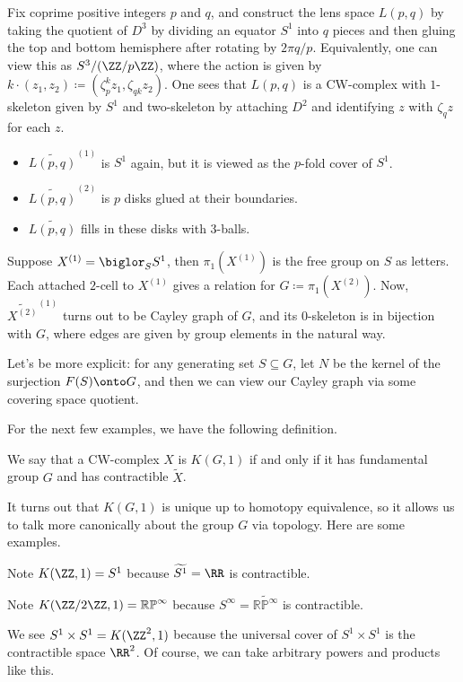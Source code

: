 \documentclass[../notes.tex]{subfiles}
\begin{document}
\begin{example}
	Fix coprime positive integers $p$ and $q$, and construct the lens space $L(p,q)$ by taking the quotient of $D^3$ by dividing an equator $S^1$ into $q$ pieces and then gluing the top and bottom hemisphere after rotating by $2\pi q/p$. Equivalently, one can view this as $S^3/(\ZZ/p\ZZ)$, where the action is given by $k\cdot(z_1,z_2)\coloneqq\left(\zeta_p^kz_1,\zeta_{qk}z_2\right)$. One sees that $L(p,q)$ is a CW-complex with $1$-skeleton given by $S^1$ and two-skeleton by attaching $D^2$ and identifying $z$ with $\zeta_qz$ for each $z$.
	\begin{itemize}
		\item $\widetilde{L(p,q)}^{(1)}$ is $S^1$ again, but it is viewed as the $p$-fold cover of $S^1$.
		\item $\widetilde{L(p,q)}^{(2)}$ is $p$ disks glued at their boundaries.
		\item $\widetilde{L(p,q)}$ fills in these disks with $3$-balls.
	\end{itemize}
\end{example}
\begin{example}
	Suppose $X^{(1)}=\biglor_SS^1$, then $\pi_1\left(X^{(1)}\right)$ is the free group on $S$ as letters. Each attached $2$-cell to $X^{(1)}$ gives a relation for $G\coloneqq\pi_1\left(X^{(2)}\right)$. Now, $\widetilde{X^{(2)}}^{(1)}$ turns out to be Cayley graph of $G$, and its $0$-skeleton is in bijection with $G$, where edges are given by group elements in the natural way.

	Let's be more explicit: for any generating set $S\subseteq G$, let $N$ be the kernel of the surjection $F(S)\onto G$, and then we can view our Cayley graph via some covering space quotient.
\end{example}
For the next few examples, we have the following definition.
\begin{definition}
	We say that a CW-complex $X$ is $K(G,1)$ if and only if it has fundamental group $G$ and has contractible $\widetilde X$.
\end{definition}
It turns out that $K(G,1)$ is unique up to homotopy equivalence, so it allows us to talk more canonically about the group $G$ via topology. Here are some examples.
\begin{example}
	Note $K(\ZZ,1)=S^1$ because $\widetilde{S^1}=\RR$ is contractible.
\end{example}
\begin{example}
	Note $K(\ZZ/2\ZZ,1)=\mathbb{RP}^\infty$ because $S^\infty=\widetilde{\mathbb{RP}^\infty}$ is contractible.
\end{example}
\begin{example}
	We see $S^1\times S^1=K(\ZZ^2,1)$ because the universal cover of $S^1\times S^1$ is the contractible space $\RR^2$. Of course, we can take arbitrary powers and products like this.
\end{example}
\end{document}
